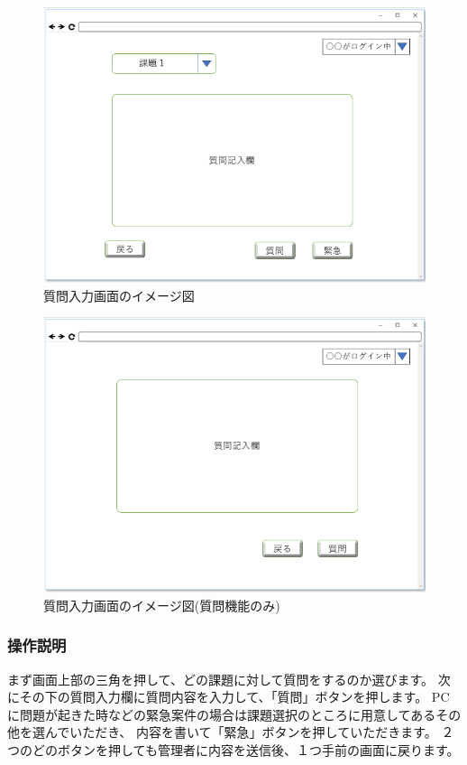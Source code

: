 \begin{figure}[htbp]
\begin{center}
  \includegraphics[width=1\linewidth,clip]{./img/36.png}
  \caption{質問入力画面のイメージ図}\label{fig:36}
\end{center}
\end{figure}

\begin{figure}[htbp]
\begin{center}
  \includegraphics[width=1\linewidth,clip]{./img/37.png}
  \caption{質問入力画面のイメージ図(質問機能のみ)}\label{fig:37}
\end{center}
\end{figure}

\subsubsection{操作説明}
まず画面上部の三角を押して、どの課題に対して質問をするのか選びます。
次にその下の質問入力欄に質問内容を入力して、「質問」ボタンを押します。
PCに問題が起きた時などの緊急案件の場合は課題選択のところに用意してあるその他を選んでいただき、
内容を書いて「緊急」ボタンを押していただきます。
２つのどのボタンを押しても管理者に内容を送信後、１つ手前の画面に戻ります。

\newpage
